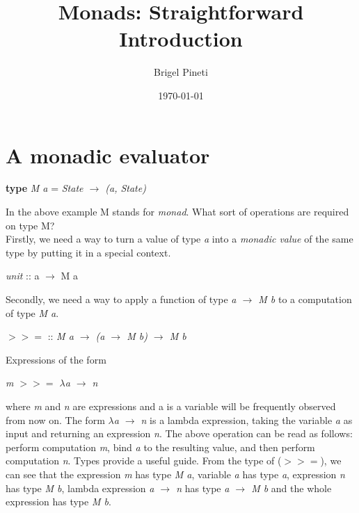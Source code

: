 \documentclass{article}
\title{Monads: Straightforward Introduction}
\author{Brigel Pineti}
\date{\today}
\begin{document}
   \maketitle
   
   
  
  \section*{A monadic evaluator}
  
  \begin{center}
      \textbf{type} \textit{M a} = \textit{State $\rightarrow$ (a, State)}
   \end{center}
   
   In the above example M stands for \textit{monad}. What sort of operations are required on type M? \\ 
   Firstly, we need a way to turn a value of type \textit{a} into a \textit{monadic value} of the same type by putting it in a special context. 
  
   \begin{center}
      \textit{unit} :: a $\rightarrow$ M a
   \end{center}
   
   Secondly, we need a way to apply a function of type \textit{a $\rightarrow$ M b} to a computation of type \textit{M a}.
  
  \begin{center}
      $>>=$ :: \textit{M a $\rightarrow$ (a $\rightarrow$ M b) $\rightarrow$ M b}
   \end{center} 
   
   Expressions of the form 
   
   \begin{center}
   \textit{m $>>=$ $\lambda$a $\rightarrow$ n} 
   \end{center}
   
   where \textit{m} and \textit{n} are expressions and a is a variable will be frequently observed from now on. The form \textit{$\lambda$a $\rightarrow$ n} is a lambda expression, taking the variable \textit{a} as input and returning an expression \textit{n}. The above operation can be read as follows: perform computation \textit{m}, bind \textit{a} to the resulting value, and then perform computation \textit{n}. Types provide a useful guide. From the type of ($>>=$), we can see that the expression \textit{m} has type \textit{M a}, variable \textit{a} has type \textit{a}, expression \textit{n} has type \textit{M b}, lambda expression \textit{\lambda a $\rightarrow$ n} has type \textit{a $\rightarrow$ M b} and the whole expression has type \textit{M b}.  
   
\end{document}
